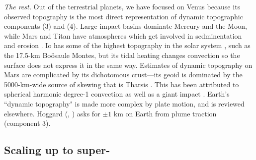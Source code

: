 










\vspace{0.5cm}

\textit{\color{teal1} The rest.} Out of the terrestrial planets, we have focused on Venus because its observed topography is the most direct representation of dynamic topographic components (3) and (4). Large impact basins dominate Mercury and the Moon, while Mars and Titan have atmospheres which get involved in sedminentation and erosion \citep{Smrekar2018}. Io has some of the highest topography in the solar system \citep{Jaeger2003}, such as the 17.5-km Bo\"{o}saule Montes, but its tidal heating changes convection so the surface does not express it in the same way. Estimates of dynamic topography on Mars are complicated by its dichotomous crust---its geoid is dominated by the 5000-km-wide source of skewing that is Tharsis \citep{Phillips2001, Wieczorek2004}. This has been attributed to spherical harmonic degree-1 convection \citep{Zhong2001} as well as a giant impact \citep{Reese2006, Andrews-Hanna2008}. Earth's ``dynamic topography" is made more complex by plate motion, and is reviewed elsewhere. Hoggard (\citeyear{Hoggard2016}, \citeyear{Hoggard2020}) asks for $\pm1$ km on Earth from plume traction (component 3).






\subsection{Scaling up to super-}

